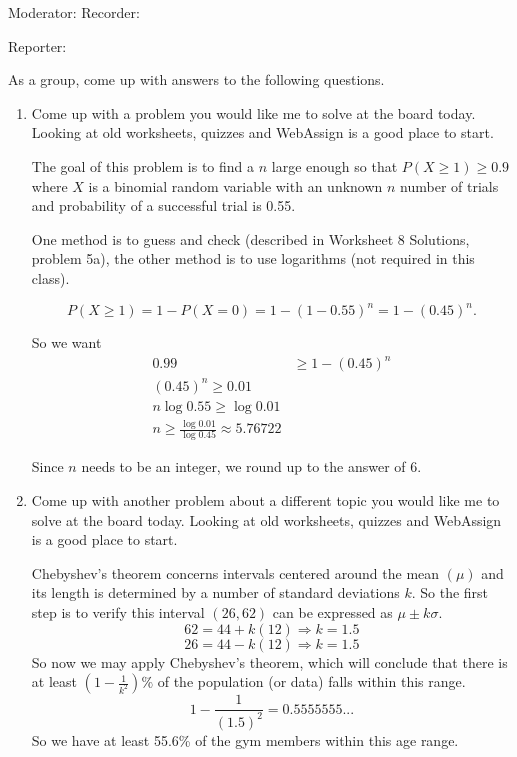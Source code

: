 \documentclass{article}
\newcommand{\answer}[1]{\color{red}#1}
\begin{document}
\pagestyle{myheadings}



\begin{center}
\textbf{}
\end{center}

Moderator:{\underbar{\hspace{2in}}} \hfill  Recorder:{\underbar{\hspace{2in}} }

\bigskip

Reporter:{\underbar{\hspace{2in}}}

As a group, come up with answers to the following questions.

\begin{enumerate} 

\item Come up with a problem you would like me to solve at the board today. Looking at old worksheets, quizzes and WebAssign is a good place to start.

{\answer The goal of this problem is to find a $n$ large enough so that $P(X\geq 1) \geq 0.9$ where $X$ is a binomial random variable with an unknown $n$ number of trials and probability of a successful trial is 0.55.

One method is to guess and check (described in Worksheet 8 Solutions, problem 5a), the other method is to use logarithms (not required in this class).

$$P(X\geq 1) = 1- P(X=0) = 1- (1-0.55)^n = 1-(0.45)^n.$$

So we want 
\begin{align*}
0.99 &\geq 1- (0.45)^n \\
(0.45)^n \geq 0.01 \\
n \log 0.55 \geq \log 0.01 \\
n \geq \frac{\log 0.01}{\log 0.45} \approx 5.76722 \end{align*}

Since $n$ needs to be an integer, we round up to the answer of 6.}

\item Come up with another problem about a different topic you would like me to solve at the board today. Looking at old worksheets, quizzes and WebAssign is a good place to start. 

{\answer Chebyshev's theorem concerns intervals centered around the mean $(\mu)$ and its length is determined by a number of standard deviations $k$. So the first step is to verify this interval $(26,62)$ can be expressed as $\mu \pm k\sigma$.
$$62 = 44 + k(12) \Rightarrow k=1.5$$
$$26 = 44 - k(12) \Rightarrow k=1.5$$
So now we may apply Chebyshev's theorem, which will conclude that there is at least $\left(1-\frac{1}{k^2}\right) \%$ of the population (or data) falls within this range.
$$1-\frac{1}{(1.5)^2} = 0.5555555...$$
So we have at least 55.6\% of the gym members within this age range.}
\end{enumerate}
\end{document}
